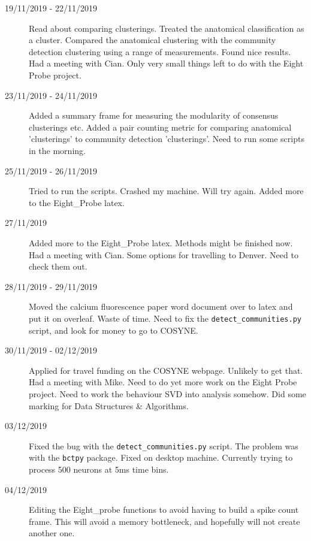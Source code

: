 \documentclass[a4paper,12pt]{article}
\theoremstyle{definition}
\begin{document}
\begin{description}
                                \item[19/11/2019 - 22/11/2019] Read about comparing clusterings. Treated the anatomical classification as a cluster. Compared the anatomical clustering with the community detection clustering using a range of measurements. Found nice results. Had a meeting with Cian. Only very small things left to do with the Eight Probe project.

                                \item[23/11/2019 - 24/11/2019] Added a summary frame for measuring the modularity of consensus clusterings etc. Added a pair counting metric for comparing anatomical 'clusterings' to community detection 'clusterings'. Need to run some scripts in the morning.

                                \item[25/11/2019 - 26/11/2019] Tried to run the scripts. Crashed my machine. Will try again. Added more to the Eight\_Probe latex.

                                \item[27/11/2019] Added more to the Eight\_Probe latex. Methods might be finished now. Had a meeting with Cian. Some options for travelling to Denver. Need to check them out.

                                \item[28/11/2019 - 29/11/2019] Moved the calcium fluorescence paper word document over to latex and put it on overleaf. Waste of time. Need to fix the \texttt{detect\_communities.py} script, and look for money to go to COSYNE.

                                \item[30/11/2019 - 02/12/2019] Applied for travel funding on the COSYNE webpage. Unlikely to get that. Had a meeting with Mike. Need to do yet more work on the Eight Probe project. Need to work the behaviour SVD into analysis somehow. Did some marking for Data Structures \& Algorithms.

                                \item[03/12/2019] Fixed the bug with the \texttt{detect\_communities.py} script. The problem was with the \texttt{bctpy} package. Fixed on desktop machine. Currently trying to process 500 neurons at 5ms time bins.

                                \item[04/12/2019] Editing the Eight\_probe functions to avoid having to build a spike count frame. This will avoid a memory bottleneck, and hopefully will not create another one.


\end{description}
\end{document}
